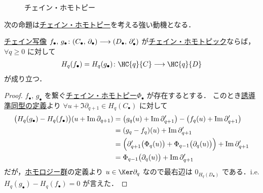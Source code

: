 \documentclass[algtopo_main]{subfiles}
\begin{document}
\begin{figure}[H]
    \centering
    \caption{チェイン・ホモトピー}
    \label{fig:chainHomotopy}
\end{figure}%

次の命題は\hyperref[def:chainHomotopy]{チェイン・ホモトピー}を考える強い動機となる．

\begin{myprop}[label=prop:chainHomotopy-basic]{}
    \hyperref[def:chainmap]{チェイン写像} $f_\bullet,\, g_\bullet \colon (C_\bullet,\, \partial_\bullet) \longrightarrow (D_\bullet,\, \partial'_\bullet)$ が\hyperref[def:chainHomotopy]{チェイン・ホモトピック}ならば，$\forall q \ge 0$ に対して
    \begin{align}
        H_q(f_\bullet) = H_q(g_\bullet) \colon \HC{q}{C} \longrightarrow \HC{q}{D}
    \end{align}
    が成り立つ．
\end{myprop}

\begin{proof}
    $f_\bullet,\, g_\bullet$ を繋ぐ\hyperref[def:chainHomotopy]{チェイン・ホモトピー}$\Phi_\bullet$ が存在するとする．
    このとき\hyperref[def:induced-chain]{誘導準同型の定義}より
    $\forall u + \Im \partial_{q+1} \in H_q(C_\bullet)$ に対して
    \begin{align}
        \bigl(H_q(g_\bullet) - H_q(f_\bullet)\bigr)(u + \Im \partial_{q+1}) &= \bigl(g_q(u) + \Im \partial'_{q+1}\bigr) - \bigl( f_q(u) + \Im \partial'_{q+1} \bigr) \\
        &= (g_q -f_q)(u) + \Im \partial'_{q+1} \\
        &= \Bigl(\partial'_{q+1} \bigl( \Phi_q(u) \bigr) + \Phi_{q-1} \bigl( \partial_q(u) \bigr)  \Bigr) + \Im \partial'_{q+1} \\
        &= \Phi_{q-1} \bigl( \partial_q(u) \bigr) + \Im \partial'_{q+1}
    \end{align}
    だが，\hyperref[def:homology-group]{ホモロジー群}の定義より $u \in \Ker \partial_q$ なので最右辺は $0_{H_q(D_\bullet)}$ である．i.e. $H_q(g_\bullet) - H_q(f_\bullet) = 0$ が言えた．
\end{proof}
\end{document}
